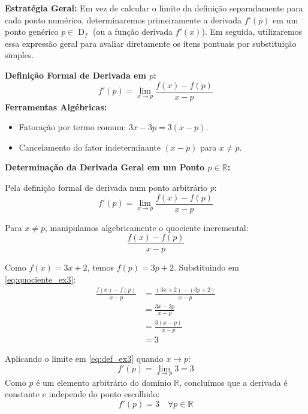 \documentclass[12pt,a4paper]{article}
\begin{document}
\begin{recursosbox}[title=Estratégia e Recursos Utilizados]
\textbf{Estratégia Geral:} Em vez de calcular o limite da definição separadamente para cada ponto numérico, determinaremos primeiramente a derivada $f'(p)$ em um ponto genérico $p \in \operatorname{D}_f$ (ou a função derivada $f'(x)$). Em seguida, utilizaremos essa expressão geral para avaliar diretamente os itens pontuais por substituição simples.

\vspace{0.2cm}
\textbf{Definição Formal de Derivada em $p$:}
\[
f'(p) = \lim_{x \to p} \frac{f(x) - f(p)}{x - p}
\]
\textbf{Ferramentas Algébricas:}
\begin{itemize}[noitemsep, topsep=2pt]
    \item Fatoração por termo comum: $3x - 3p = 3(x - p)$.
    \item Cancelamento do fator indeterminante $(x - p)$ para $x \neq p$.
\end{itemize}
\end{recursosbox}

\textbf{Determinação da Derivada Geral em um Ponto $p \in \mathbb{R}$:}

Pela definição formal de derivada num ponto arbitrário $p$:
\begin{equation}
    f'(p) = \lim_{x \to p} \frac{f(x) - f(p)}{x - p} \label{eq:def_ex3}
\end{equation}

Para $x \neq p$, manipulamos algebricamente o quociente incremental:
\begin{equation}
    \frac{f(x) - f(p)}{x - p} \label{eq:quociente_ex3}
\end{equation}

Como $f(x) = 3x + 2$, temos $f(p) = 3p + 2$. Substituindo em \eqref{eq:quociente_ex3}:
\begin{align*}
    \frac{f(x) - f(p)}{x - p} &= \frac{(3x + 2) - (3p + 2)}{x - p} \\[0.25cm]
    &= \frac{3x - 3p}{x - p} \\[0.25cm]
    &= \frac{3(x - p)}{x - p} \\[0.25cm]
    &= 3
\end{align*}

Aplicando o limite em \eqref{eq:def_ex3} quando $x \to p$:
\[
f'(p) = \lim_{x \to p} 3 = 3
\]
Como $p$ é um elemento arbitrário do domínio $\mathbb{R}$, concluímos que a derivada é constante e independe do ponto escolhido:
\begin{equation}
    f'(p) = 3 \quad \forall p \in \mathbb{R} \label{eq:resultado_geral_ex3}
\end{equation}
\end{document}
